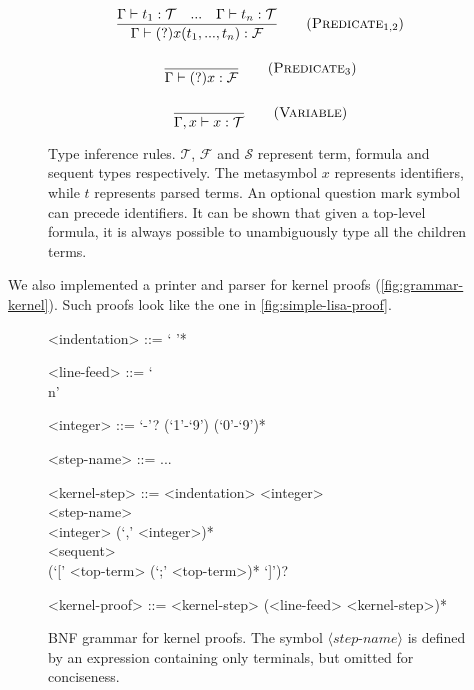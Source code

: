 \begin{figure}[H]
\begin{framed}
\begin{gather}
  \frac{\Gamma \vdash t_1: \mathcal{T} \quad ... \quad \Gamma \vdash t_n: \mathcal{T}}{\Gamma \vdash (?)x(t_1, ..., t_n): \mathcal{F}}
  \tag{$\textsc{Predicate}_{1,2}$} \\[1em]
  \frac{}{\Gamma \vdash (?)x: \mathcal{F}} \tag{$\textsc{Predicate}_3$} \\[1em]
  \frac{}{\Gamma, x \vdash x: \mathcal{T}} \tag{\textsc{Variable}}
  \end{gather}
  \end{framed}
  \caption[Type inference rules]{Type inference rules. $\mathcal{T}$, $\mathcal{F}$ and $\mathcal{S}$ represent term, formula and sequent types respectively. The metasymbol $x$ represents identifiers, while $t$ represents parsed terms. An optional question mark symbol can precede identifiers. It can be shown that given a top-level formula, it is always possible to unambiguously type all the children terms.}
  \label{fig:typing-rules}
\end{figure}

We also implemented a printer and parser for kernel proofs (\autoref{fig:grammar-kernel}). Such proofs look like the one in \autoref{fig:simple-lisa-proof}.

\begin{figure}[H]
  \centering
  \begin{framed}
  \begin{grammar}
  <indentation> ::= ` '*

  <line-feed> ::= `\\n'
  
  <integer> ::= `-'? (`1'-`9') (`0'-`9')*

  <step-name> ::= ...

  <kernel-step> ::= <indentation> <integer> \\ 
  <step-name> \\
  <integer> (`,' <integer>)* \\
  <sequent> \\
  (`[' <top-term> (`;' <top-term>)* `]')?

  <kernel-proof> ::= <kernel-step> (<line-feed> <kernel-step>)*
  \end{grammar}
  \end{framed}
  \caption[BNF grammar for kernel proofs]{BNF grammar for kernel proofs. The symbol $\langle\textit{step-name}\rangle$ is defined by an expression containing only terminals, but omitted for conciseness.}
  \label{fig:grammar-kernel}
\end{figure}

